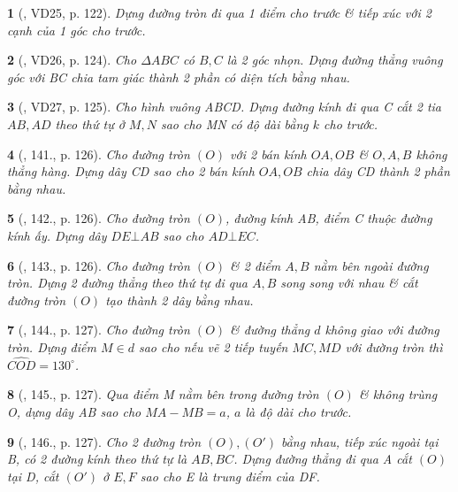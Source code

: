 \documentclass{article}
\newtheorem{baitoan}{}
\begin{document}
\begin{baitoan}[\cite{Binh_Toan_9_tap_1}, VD25, p. 122]
	Dựng đường tròn đi qua 1 điểm cho trước \& tiếp xúc với 2 cạnh của 1 góc cho trước.
\end{baitoan}

\begin{baitoan}[\cite{Binh_Toan_9_tap_1}, VD26, p. 124]
	Cho $\Delta ABC$ có $B,C$ là 2 góc nhọn. Dựng đường thẳng vuông góc với BC chia tam giác thành 2 phần có diện tích bằng nhau.
\end{baitoan}

\begin{baitoan}[\cite{Binh_Toan_9_tap_1}, VD27, p. 125]
	Cho hình vuông ABCD. Dựng đường kính đi qua C cắt 2 tia $AB,AD$ theo thứ tự ở $M,N$ sao cho MN có độ dài bằng $k$ cho trước.
\end{baitoan}

\begin{baitoan}[\cite{Binh_Toan_9_tap_1}, 141., p. 126]
	Cho đường tròn $(O)$ với 2 bán kính $OA,OB$ \& $O,A,B$ không thẳng hàng. Dựng dây CD sao cho 2 bán kính $OA,OB$ chia dây CD thành 2 phần bằng nhau.
\end{baitoan}

\begin{baitoan}[\cite{Binh_Toan_9_tap_1}, 142., p. 126]
	Cho đường tròn $(O)$, đường kính AB, điểm C thuộc đường kính ấy. Dựng dây $DE\bot AB$ sao cho $AD\bot EC$.
\end{baitoan}

\begin{baitoan}[\cite{Binh_Toan_9_tap_1}, 143., p. 126]
	Cho đường tròn $(O)$ \& 2 điểm $A,B$ nằm bên ngoài đường tròn. Dựng 2 đường thẳng theo thứ tự đi qua $A,B$ song song với nhau \& cắt đường tròn $(O)$ tạo thành 2 dây bằng nhau.
\end{baitoan}

\begin{baitoan}[\cite{Binh_Toan_9_tap_1}, 144., p. 127]
	Cho đường tròn $(O)$ \& đường thẳng $d$ không giao với đường tròn. Dựng điểm $M\in d$ sao cho nếu vẽ 2 tiếp tuyến $MC,MD$ với đường tròn thì $\widehat{COD} = 130^\circ$.
\end{baitoan}

\begin{baitoan}[\cite{Binh_Toan_9_tap_1}, 145., p. 127]
	Qua điểm M nằm bên trong đường tròn $(O)$ \& không trùng O, dựng dây AB sao cho $MA - MB = a$, $a$ là độ dài cho trước.
\end{baitoan}

\begin{baitoan}[\cite{Binh_Toan_9_tap_1}, 146., p. 127]
	Cho 2 đường tròn $(O),(O')$ bằng nhau, tiếp xúc ngoài tại B, có 2 đường kính theo thứ tự là $AB,BC$. Dựng đường thẳng đi qua A cắt $(O)$ tại D, cắt $(O')$ ở $E,F$ sao cho E là trung điểm của DF.
\end{baitoan}
\end{document}
